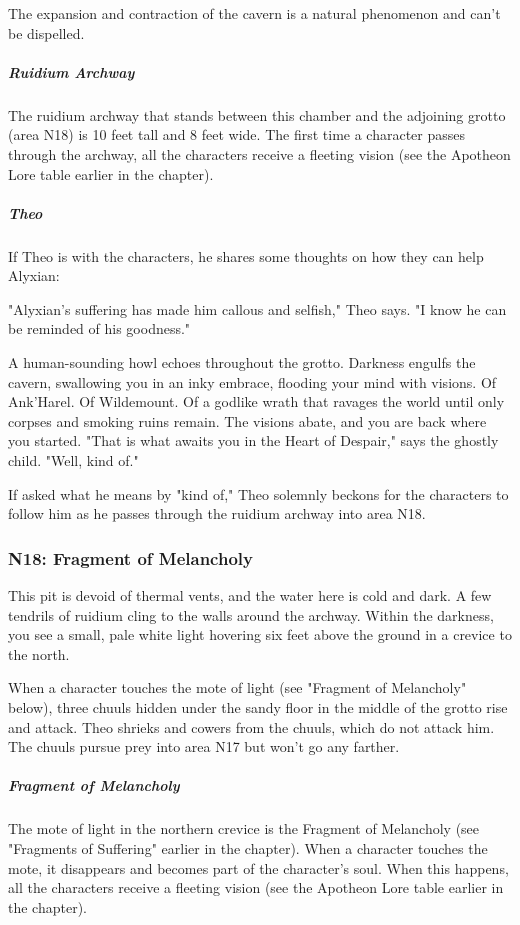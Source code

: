 \documentclass[10pt,a4paper,twoside,fancy,bg=print,twocolumn,openany,nodeprecatedcode]{dndbook}
\begin{document}
The expansion and contraction of the cavern is a natural phenomenon and can't be dispelled.

\subparagraph{Ruidium Archway}
The ruidium archway that stands between this chamber and the adjoining grotto (area N18) is 10 feet tall and 8 feet wide. The first time a character passes through the archway, all the characters receive a fleeting vision (see the Apotheon Lore table earlier in the chapter).

\subparagraph{Theo}
If Theo is with the characters, he shares some thoughts on how they can help Alyxian:

\begin{DndReadAloud}{}
"Alyxian's suffering has made him callous and selfish," Theo says. "I know he can be reminded of his goodness."

A human-sounding howl echoes throughout the grotto. Darkness engulfs the cavern, swallowing you in an inky embrace, flooding your mind with visions. Of Ank'Harel. Of Wildemount. Of a godlike wrath that ravages the world until only corpses and smoking ruins remain. The visions abate, and you are back where you started. "That is what awaits you in the Heart of Despair," says the ghostly child. "Well, kind of."

\end{DndReadAloud}

If asked what he means by "kind of," Theo solemnly beckons for the characters to follow him as he passes through the ruidium archway into area N18.

\subsubsection{N18: Fragment of Melancholy}
\begin{DndReadAloud}{}
This pit is devoid of thermal vents, and the water here is cold and dark. A few tendrils of ruidium cling to the walls around the archway. Within the darkness, you see a small, pale white light hovering six feet above the ground in a crevice to the north.

\end{DndReadAloud}

When a character touches the mote of light (see "Fragment of Melancholy" below), three chuuls hidden under the sandy floor in the middle of the grotto rise and attack. Theo shrieks and cowers from the chuuls, which do not attack him. The chuuls pursue prey into area N17 but won't go any farther.

\subparagraph{Fragment of Melancholy}
The mote of light in the northern crevice is the Fragment of Melancholy (see "Fragments of Suffering" earlier in the chapter). When a character touches the mote, it disappears and becomes part of the character's soul. When this happens, all the characters receive a fleeting vision (see the Apotheon Lore table earlier in the chapter).
\end{document}
